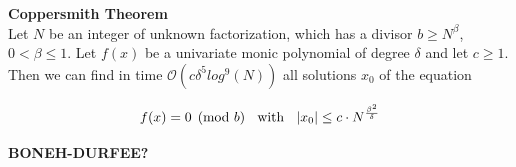 \documentclass{beamer}
\begin{document}
\begin{frame}
\textbf{Coppersmith Theorem} \\
Let $N$ be an integer of unknown factorization, which has a divisor $b \geq N^{\beta}$, $0 < \beta \leq 1$. Let $f(x)$ be a univariate monic polynomial of degree $\delta$ and let $c \geq 1$.\\
Then we can find in time $\mathcal{O}(c\delta^5log^9(N))$ all solutions $x_0$ of the equation

\[ f(x) = 0 \pmod{b} \hspace{2mm} \text{ with } \hspace{2mm} |x_0| \leq c \cdot N^{\frac{\beta^2}{\delta}} \]
\end{frame}

\fontsize{90pt}{15.2}\selectfont
{}
\begin{frame}
\begin{center}

\textbf{BONEH-DURFEE?}
\end{center}
\end{frame}

\fontsize{16pt}{15.2}\selectfont
\usebackgroundtemplate{}
%
\end{document}
